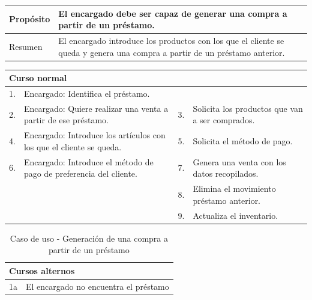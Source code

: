 \begin{table}[H]
	\centering
	\begin{tabular}{| m{} | m{} | m{} | m{} |}
		\hline
		Propósito & \multicolumn{3}{m{0.67\textwidth}|}{El encargado debe ser capaz de generar una compra a partir de un préstamo.}  \\ 
		\hline
		Resumen & \multicolumn{3}{m{0.67\textwidth}|}{El encargado introduce los productos con los que el cliente se queda y genera una compra a partir de un préstamo anterior.} \\ 
		\hline
	\end{tabular}
\end{table}


\begin{table}[H]
	\centering
	\begin{tabular}{| m{} | m{} | m{} | m{} |}
		\hline
		\multicolumn{4}{|m{0.9\textwidth}|}{Curso normal}     \\ 
		\hline
		1. & Encargado: Identifica el préstamo. &  &   \\ 
		\hline
		2. & Encargado: Quiere realizar una venta a partir de ese préstamo. & 3. &  Solicita los productos que van a ser comprados.  \\ 
		\hline
		4. & Encargado: Introduce los artículos con los que el cliente se queda. & 5. &  Solicita el método de pago.  \\ 
		\hline
		6. & Encargado: Introduce el método de pago de preferencia del cliente. & 7. &  Genera una venta con los datos recopilados.  \\ 
		\hline
		&  & 8. &  Elimina el movimiento préstamo anterior.  \\ 
		\hline
		&  & 9. &  Actualiza el inventario.  \\ 
		\hline
	\end{tabular}
\end{table}

\begin{table}[H]
	\centering
	\begin{tabular}{| m{} | m{} | m{} | m{} |}
		\hline
		\multicolumn{4}{|m{0.9\textwidth}|}{Cursos alternos}     \\ 
		\hline
		1a & \multicolumn{3}{m{0.67\textwidth}|}{El encargado no encuentra el préstamo} \\ 
		\hline
	\end{tabular}
	\caption{Caso de uso - Generación de una compra a partir de un préstamo}
\end{table}


